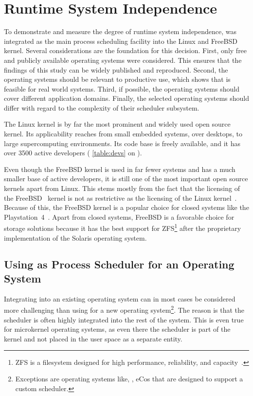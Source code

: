 \section{Runtime System Independence}%
\label{sec:studies:independence}

To demonstrate and measure the degree of runtime system independence, \cobas{} was integrated as the main process scheduling facility into the Linux and FreeBSD kernel. Several considerations are the foundation for this decision. First, only free and publicly available operating systems were considered. This ensures that the findings of this study can be widely published and reproduced. Second, the operating systems should be relevant to productive use, which shows that \cobas{} is feasible for real world systems. Third, if possible, the operating systems should cover different application domains. Finally, the selected operating systems should differ with regard to the complexity of their scheduler subsystem.

The Linux kernel is by far the most prominent and widely used open source kernel. Its applicability reaches from small embedded systems, over desktops, to large supercomputing environments. Its code base is freely available, and it has over \num{3500} active developers (\cf{} \cref{table:devs} on ).

Even though the FreeBSD kernel is used in far fewer systems and has a much smaller base of active developers, it is still one of the most important open source kernels apart from Linux. This stems mostly from the fact that the licensing of the FreeBSD~\cite[\cf{}][]{FreeBSD-License} kernel is not as restrictive as the licensing of the Linux kernel~\cite[\cf{}][]{GPL}. Because of this, the FreeBSD kernel is a popular choice for closed systems like the Playstation~4~\cite{PlayStation4}. Apart from closed systems, FreeBSD is a favorable choice for storage solutions because it has the best support for ZFS\footnote{ZFS is a filesystem designed for high performance, reliability, and capacity~\cite[24\psqq]{ZFS}.} after the proprietary implementation of the Solaris operating system.

\subsection{Using \cobas{} as Process Scheduler for an Operating System}

Integrating \cobas{} into an existing operating system can in most cases be considered more challenging than using \cobas{} for a new operating system\footnote{Exceptions are operating systems like, \eg{}, eCos that are designed to support a custom scheduler.}. The reason is that the scheduler is often highly integrated into the rest of the system. This is even true for microkernel operating systems, as even there the scheduler is part of the kernel and not placed in the user space as a separate entity.

